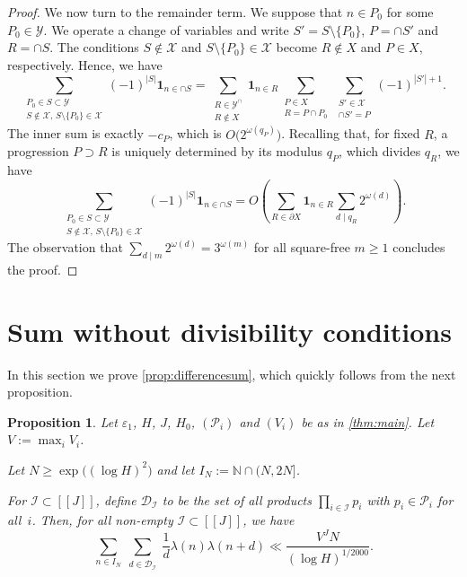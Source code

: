 \documentclass[11pt]{amsart}
\newtheorem{proposition}[theorem]{Proposition}
\theoremstyle{definition}
\renewcommand{\geq}{\geqslant}
\newcommand{\sinterval}[1]{[\![#1]\!] }
\newcommand{\ind}[1]{\mathbf{1}_{#1}}
\newcommand{\eps}{\varepsilon}
\newcommand{\N}{I_N}
\newcommand{\primes}{\mathcal{P}}
\newcommand{\D}{\mathcal{D}}
\newcommand{\cstH}{\eps_1}
\newcommand{\curlyL}{V}
\newcommand{\curlyLpower}{V^{\repR}}
\newcommand{\prohibprog}{\mathcal{Y}}
\newcommand{\modulus}{q}
\newcommand{\indexset}{\mathcal{I}}
\newcommand{\repR}{J}
\newcommand{\newR}{\sinterval{J}}
\newcommand{\appendixsubcoll}{\mathcal{X}}
\begin{document}
\begin{proof}
We now turn to the remainder term. We suppose that $n\in P_0$ for some $P_0\in \prohibprog$. We operate a change of variables and write ${S' = S \setminus \{P_0\}}$, $P = \cap S'$ and ${R = \cap S}$. The conditions $S \not\in \appendixsubcoll$ and $S\setminus \{P_0\} \in \appendixsubcoll$ become $R\not\in X$ and $P\in X$, respectively. Hence, we have 
\begin{equation*}
\sum_{\substack{P_0\in S \subset \prohibprog\\ S \not\in \appendixsubcoll,\, S\setminus \{P_0\} \in \appendixsubcoll}} (-1)^{|S|} \ind{n\in \cap S} 
= \sum_{\substack{R\in \prohibprog^{\cap} \\ R\not \in X }}  \ind{n\in R}  \sum_{\substack{P\in X \\ R = P\cap P_0}}\sum_{\substack{S'\in \appendixsubcoll\\ \cap S'= P}} (-1)^{|S'|+1}.
\end{equation*}
The inner sum is exactly $-c_P$, which is $O\big(2^{\omega(\modulus_{P})}\big)$. Recalling that, for fixed $R$, a progression $P\supset R$ is uniquely determined by its modulus $\modulus_{P}$, which divides $\modulus_{R}$, we have
\begin{equation*}
\sum_{\substack{P_0\in S \subset \prohibprog\\ S \not\in \appendixsubcoll,\, S\setminus \{P_0\} \in \appendixsubcoll}} (-1)^{|S|} \ind{n\in \cap S} 
= O \left(\sum_{R\in \partial X}  \ind{n\in R}  \sum_{d\mid \modulus_{R}} 2^{\omega(d)}\right).
\end{equation*}
The observation that $\sum_{d\mid m} 2^{\omega(d)} = 3^{\omega(m)}$ for all square-free $m\geq 1$ concludes the proof.
\end{proof}



\section{Sum without divisibility conditions}
\label{appendix:probmodel}

In this section we prove \cref{prop:differencesum}, which quickly follows from the next proposition.

\begin{proposition}
\label{prop:probmodel}
Let $\cstH$, $H$, $\repR$, $H_0$, $(\primes_i)$ and $(\curlyL_i)$ be as in \cref{thm:main}. Let $\curlyL := \max_i \curlyL_i$. 

Let $N \geq \exp\big((\log H)^{2}\big)$ and let $\N := \mathbb{N} \cap (N, 2N]$.

For $\indexset \subset \newR$, define $\D_\indexset$ to be the set of all products $\prod_{i\in \indexset}p_i$ with $p_i\in \primes_i$ for all~$i$.
Then, for all non-empty $\indexset \subset \newR$, we have
\begin{equation*}
 \sum_{n\in \N}  \sum_{\substack{d\in \D_\indexset}}\frac{1}{d} \lambda(n) \lambda(n+d) \ll \frac{\curlyLpower N}{(\log H)^{1/2000}}.
\end{equation*}
\end{proposition}
\end{document}
